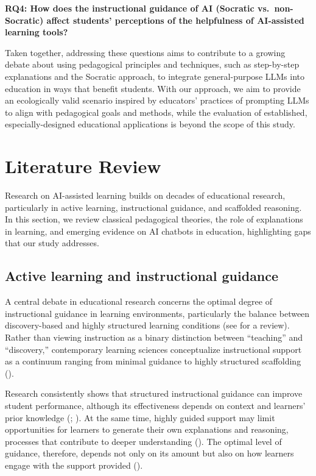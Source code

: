 \documentclass[
  11pt,
]{article}
\begin{document}
\textbf{RQ4: How does the instructional guidance of AI (Socratic vs.~non-Socratic) affect students' perceptions of the helpfulness of AI-assisted learning tools?}

Taken together, addressing these questions aims to contribute to a growing debate about using pedagogical principles and techniques, such as step-by-step explanations and the Socratic approach, to integrate general-purpose LLMs into education in ways that benefit students. With our approach, we aim to provide an ecologically valid scenario inspired by educators' practices of prompting LLMs to align with pedagogical goals and methods, while the evaluation of established, especially-designed educational applications is beyond the scope of this study.

\section{Literature Review}\label{literature-review}

Research on AI-assisted learning builds on decades of educational research, particularly in active learning, instructional guidance, and scaffolded reasoning. In this section, we review classical pedagogical theories, the role of explanations in learning, and emerging evidence on AI chatbots in education, highlighting gaps that our study addresses.

\subsection{Active learning and instructional guidance}\label{active-learning-and-instructional-guidance}

A central debate in educational research concerns the optimal degree of instructional guidance in learning environments, particularly the balance between discovery-based and highly structured learning conditions (see  for a review). Rather than viewing instruction as a binary distinction between ``teaching'' and ``discovery,'' contemporary learning sciences conceptualize instructional support as a continuum ranging from minimal guidance to highly structured scaffolding ().

Research consistently shows that structured instructional guidance can improve student performance, although its effectiveness depends on context and learners' prior knowledge (; ). At the same time, highly guided support may limit opportunities for learners to generate their own explanations and reasoning, processes that contribute to deeper understanding (). The optimal level of guidance, therefore, depends not only on its amount but also on how learners engage with the support provided ().
\end{document}
